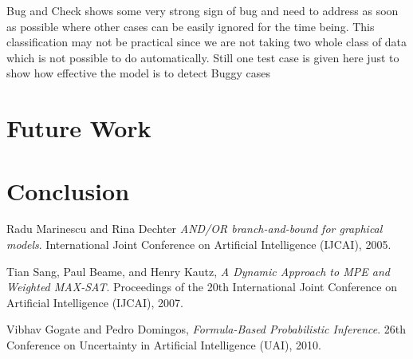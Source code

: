 \documentclass[11pt]{article}
\begin{document}
Bug and Check shows some very strong sign of bug and need to address as soon as possible where other cases can be easily ignored for the time being. This classification may not be practical since we are not taking two whole class of data which is not possible to do automatically. Still one test case is given here just to show how effective the model is to detect Buggy cases

\section{Future Work}

\section{Conclusion}

\begin{thebibliography}{9}

	   Radu Marinescu and Rina Dechter
	  \emph{	AND/OR branch-and-bound for graphical models}.
	  International Joint Conference on Artificial Intelligence (IJCAI), 2005.

	  Tian Sang, Paul Beame, and Henry Kautz,
	  \emph{A Dynamic Approach to MPE and Weighted MAX-SAT}.
	  Proceedings of the 20th International Joint Conference on Artificial Intelligence (IJCAI), 2007.

	  Vibhav Gogate and Pedro Domingos,
	  \emph{Formula-Based Probabilistic Inference}.
	  26th Conference on Uncertainty in Artificial Intelligence (UAI), 2010.

\end{thebibliography}
\end{document}
